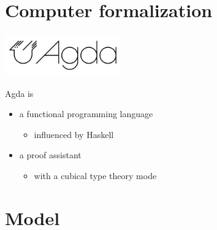\documentclass[aspectratio=1610]{beamer}
\begin{document}
\begin{frame}
\begin{columns}
\begin{column}{0.5\textwidth}
    \end{column}
  \end{columns}
\end{frame}

\section{Computer formalization}

\begin{frame}
  \frametitle{\includegraphics[width=5cm]{./images/agda-logo.png}}

  Agda is
  \begin{itemize}
    \item
      a functional programming language
      \begin{itemize}
        \item
          influenced by Haskell
      \end{itemize}
    \item
      a proof assistant
      \begin{itemize}
        \item
          with a \alert{cubical type theory} mode
      \end{itemize}
  \end{itemize}
\end{frame}

\section{Model}
\end{document}
